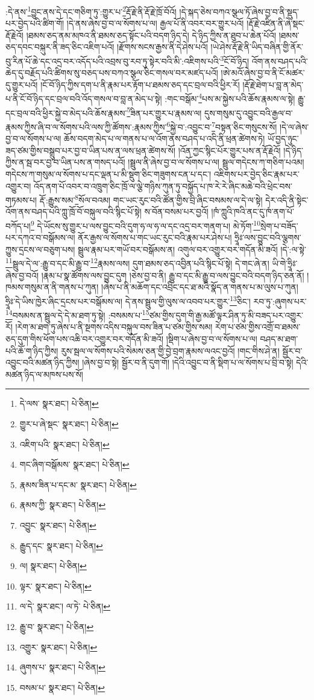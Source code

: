 :དེ་ནས་\footnote{དེ་ལས་  སྣར་ཐང་།  པེ་ཅིན། }བྱུང་ནས་དེ་དང་གཅིག་ཏུ་:གྱུར་པ་\footnote{གྱུར་པ་ཞེ་སྡང་  སྣར་ཐང་།  པེ་ཅིན། }རྡོ་རྗེ་ནི་རྡོ་རྗེ་ཁྲོ་བོའོ། །དེ་སྐད་ཅེས་བཀའ་སྩལ་ཏོ་ཞེས་བྱ་བ་ནི་སྡུད་པར་བྱེད་པའི་ཚིག་གོ། །དེ་ནས་ཞེས་བྱ་བ་ལ་སོགས་པ་ལ། རྒྱལ་པོ་ནི་འབར་བར་གྱུར་པའོ། །རྡོ་རྗེ་འཛིན་ནི་ཞེ་སྡང་རྡོ་རྗེའོ། །ཐམས་ཅད་ནམ་མཁའ་ནི་ཐམས་ཅད་སྟོང་པའི་བདག་ཉིད་དེ། དེ་ཉིད་ཀྱིས་ན་ཐུབ་པ་ཆེན་པོའོ། །ཐམས་ཅད་དབང་བསྐུར་ནི་ཟད་ཅིང་འཇིག་པའོ། །རྫོགས་སངས་རྒྱས་ནི་དེ་ཤེས་པའོ། །ཡེ་ཤེས་རྡོ་རྗེ་ནི་ཡིད་བཞིན་གྱི་ནོར་བུ་རིན་པོ་ཆེ་དང་འདྲ་བར་འདོད་པའི་འབྲས་བུ་རབ་ཏུ་སྟེར་བའི་མི་:འཇིགས་པའི་\footnote{འཇིག་པའི་  སྣར་ཐང་།  པེ་ཅིན། }ངོ་བོ་ཉིད། འོག་ནས་བཤད་པའི་ཆེད་དུ་བརྗོད་པའི་ཚིགས་སུ་བཅད་པས་བཀའ་སྩལ་ཅིང་གསལ་བར་མཛད་པའོ། །ཨེ་མའོ་ཞེས་བྱ་བ་ནི་ངོ་མཚར་དུ་གྱུར་པའོ། །ངོ་བོ་ཉིད་ཀྱིས་དག་པ་ནི་རྣམ་པར་རྟོག་པ་ཐམས་ཅད་དང་བྲལ་བའི་ཕྱིར་རོ། །རྡོ་རྗེ་ཐེག་པ་བླ་ན་མེད་པ་ནི་ངོ་བོ་ཉིད་དང་བྲལ་བའི་འོད་གསལ་བ་བླ་ན་མེད་པ་སྟེ། :གང་བསྒོམ་\footnote{གང་ཞིག་བསྒོམས་  སྣར་ཐང་།  པེ་ཅིན། }པས་མ་སྐྱེས་པའི་ཆོས་རྣམས་ལ་སྟེ། རྒྱུ་དང་བྲལ་བའི་ཕྱིར་སྐྱེ་བ་མེད་པའི་ཆོས་རྣམས་\footnote{རྣམས་ཟིན་པ་དང་མ་  སྣར་ཐང་།  པེ་ཅིན། }ཟིན་པར་གྱུར་པ་རྣམས་ལ། དུས་གསུམ་དུ་འབྱུང་བའི་རྒྱལ་བ་རྣམས་ཀྱིས་ཞི་བ་ལ་སོགས་པའི་ལས་ཀྱི་ཚོགས་:རྣམས་ཀྱིས་\footnote{རྣམས་ཀྱི་  སྣར་ཐང་།  པེ་ཅིན། }སྐྱེ་བ་:འབྱུང་བ་\footnote{འབྱུང་  སྣར་ཐང་།  པེ་ཅིན། }བསྟན་ཅིང་གསུངས་སོ། །དེ་ལ་ཞེས་བྱ་བ་ལ་སོགས་པ་ལ། ཆོས་བདག་མེད་པ་ལ་གནས་པ་ལ་འོག་ནས་བཤད་པ་འདི་ནི་ཕྲན་ཚེགས་ཏེ། ཡོ་བྱད་ཉུང་ཟད་ཙམ་གྱིས་བསྒྲུབ་པར་བྱ་བ་ཡིན་པས་ན་ལས་ཕྲན་ཚེགས་སོ། །འོན་ཀྱང་སྙིང་པོར་གྱུར་པས་ན་རྡོ་རྗེའོ། །དེ་ཉིད་ཀྱིས་ན་སྦ་བར་བྱ་བ་ཡིན་པས་ན་གསད་པའོ། །སྦྲུལ་ནི་ཞེས་བྱ་བ་ལ་སོགས་པ་ལ། སྦྲུལ་གདེངས་ཀ་གཅིག་པའམ། གདེངས་ཀ་གསུམ་ལ་སོགས་པ་དང་ལྡན་པ་མི་སྡུག་ཅིང་གཟུགས་ངན་པ་དང་། འཇིགས་པར་བྱེད་ཅིང་རྣམ་པར་འགྱུར་བ། འོད་ནག་པོ་འབར་བ་འཁྲུག་ཅིང་ཁྲོ་ལ་ལྕེ་གཉིས་ཀུན་ཏུ་བསྐྱོད་པ་ཁ་རེ་རེ་ཞིང་མཆེ་བའི་ཕྲེང་བས་གཏམས་པ། རྡོ་:རྒྱུས་སམ་\footnote{རྒྱུད་དང་  སྣར་ཐང་།  པེ་ཅིན། }སོལ་བའམ། གང་ཡང་རུང་བའི་ཚོན་གྱིས་བྲི་ཞིང་བསམས་ལ་དེ་ལ་སྟེ། དེར་འདི་ནི་སྟེང་འོག་ནས་བཤད་པའི་ཀླུ་ཁྲོ་བོ་བསྐུལ་བའི་སྙིང་པོ་སྟེ། ས་བོན་བསམ་པར་བྱའོ། །ཁཾ་ཀླུའི་ཁའི་ནང་དུ་ཁཾ་ནག་པོ་བཀོད་པ།\footnote{ལ།  སྣར་ཐང་།  པེ་ཅིན། } དེ་ཡོངས་སུ་གྱུར་པ་ལས་བྱུང་བའི་དུག་ཧ་ལ་ཧ་ལ་དང་འདྲ་བར་གནག་པ། མེ་ཏོག་\footnote{ལྟར་  སྣར་ཐང་།  པེ་ཅིན། }སྲེག་པ་བཟོད་པར་དཀའ་བ་བསྒོམས་ལ། ནོར་རྒྱས་ལ་སོགས་པ་གང་ཡང་རུང་བའི་རྣམ་པར་ཤེས་པ། ཧྲཱིཿ་ལས་བྱུང་བའི་ལྕགས་ཀྱུས་དྲངས་ལ་བཅུག་པས། སྦྲུལ་རྣམ་པར་གཡོ་བར་བསྒོམས་ན། འགུལ་བར་འགྱུར་བར་གདོན་མི་ཟའོ། །དེ་:ལ་སྟེ་\footnote{ལ་དེ་  སྣར་ཐང་། ལ་ཏེ་  པེ་ཅིན། }སྦྲུལ་དེ་ལ་:རྒྱུ་བ་དང་མི་རྒྱུ་བ་\footnote{རྒྱུ་བ་  སྣར་ཐང་།  པེ་ཅིན། }རྣམས་ལས། དུག་ཐམས་ཅད་འབྱིན་པའི་སྙིང་པོ་སྟེ། དེ་གང་ཞེ་ན། ཡི་གེ་ཧྲཱིཿ་ཞེས་བྱ་བའོ། །རྣམ་པ་སྣ་ཚོགས་ལས་བྱུང་དུག །ཅེས་བྱ་བ་ནི། རྒྱུ་བ་དང་མི་རྒྱུ་བ་ལས་བྱུང་བའི་བདག་ཉིད་ཅན་ནོ། །ཁམས་གསུམ་ན་ནི་གནས་པ་ཀུན། །ཞེས་པ་ནི་མཆོག་དང་འབྲིང་དང་ཐ་མའི་སྣོད་ན་གནས་པ་མ་ལུས་པ་ཀུན། ཧྲཱིཿ་དེ་ཡིས་ཁྱེར་ཞིང་དྲངས་པར་བསྒོམས་ལ། དེ་ནས་སྦྲུལ་གྱི་ལུས་ལ་འབབ་པར་གྱུར་\footnote{འགྱུར་  སྣར་ཐང་།  པེ་ཅིན། }ཅིང་། རབ་ཏུ་:ཞུགས་པར་\footnote{ཞུགས་པ་  སྣར་ཐང་།  པེ་ཅིན། }བསམས་ན་སྦྲུལ་དེ་དེ་མ་ཐག་ཏུ་སྟེ། :བསམས་པ་\footnote{བསམ་པ་  སྣར་ཐང་།  པེ་ཅིན། }ཙམ་གྱིས་དུག་གི་རྒྱ་མཚོ་ལྟར་ཤིན་ཏུ་མི་བཟད་པར་འགྱུར་རོ། །རེག་མ་ཐག་ཏུ་ཞེས་པ་ནི་སྔགས་འདིས་བསྐུལ་བས་ཟིན་པ་ཙམ་གྱིས་སམ། རེག་པ་ཙམ་གྱིས་འགྲོ་བ་ཐམས་ཅད་དུག་གིས་ཕོག་པས་འཆི་བར་འགྱུར་བར་གདོན་མི་ཟའོ། །སྡིག་པ་ཞེས་བྱ་བ་ལ་སོགས་པ་ལ། བཤད་མ་ཐག་པའི་ཆོ་ག་ཉིད་ཀྱིས། རུས་སྦལ་ལ་སོགས་པའི་སེམས་ཅན་གྱི་བྱེ་བྲག་རྣམས་ལའང་བྱའོ། །གང་གིས་ཤེ་ན། སྦྱོར་བ་འབྱུང་བའི་མཚན་ཉིད་ཀྱིས། །ཞེས་བྱ་བ་སྟེ། སྦྱོར་བ་ནི་དུག་གོ། །དེའི་འབྱུང་བ་ནི་སྡིག་པ་ལ་སོགས་པ་བྲི་བ་སྟེ། དེའི་མཚན་ཉིད་ལ་མཁས་པས་སོ། 
